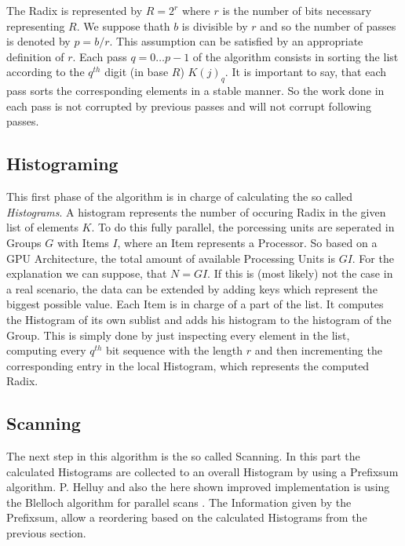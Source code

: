 \documentclass{llncs}
\begin{document}
The Radix is represented by $R = 2^r$ where $r$ is the number of bits necessary representing $R$. We suppose thath $b$ is divisible by $r$ and so the number of passes is denoted by $p = b/r$. This assumption can be satisfied by an appropriate definition of $r$. Each pass $q=0 \dots p-1$ of the algorithm consists in sorting the list according to the $q^{th}$ digit (in base $R$) $K(j)_q$. It is important to say, that each pass sorts the corresponding elements in a stable manner. So the work done in each pass is not corrupted by previous passes and will not corrupt following passes.



\subsection{Histograming}
This first phase of the algorithm is in charge of calculating the so called \textit{Histograms}. A histogram represents the number of occuring Radix in the given list of elements $K$. To do this fully parallel, the porcessing units are seperated in Groups $G$ with Items $I$, where an Item represents a Processor. So based on a GPU Architecture, the total amount of available Processing Units is $GI$. For the explanation we can suppose, that $N=GI$. If this is (most likely) not the case in a real scenario, the data can be extended by adding keys which represent the biggest possible value. Each Item is in charge of a part of the list. It computes the Histogram of its own sublist and adds his histogram to the histogram of the Group. This is simply done by just inspecting every element in the list, computing every $q^{th}$ bit sequence with the length $r$ and then incrementing the corresponding entry in the local Histogram, which represents the computed Radix.


\subsection{Scanning}
The next step in this algorithm is the so called Scanning. In this part the calculated Histograms are collected to an overall Histogram by using a Prefixsum algorithm. P. Helluy \cite{ocl-radix-helluy} and also the here shown improved implementation is using the Blelloch algorithm for parallel scans \cite{blelloch1989scans}. The Information given by the Prefixsum, allow a reordering based on the calculated Histograms from the previous section.
\end{document}
